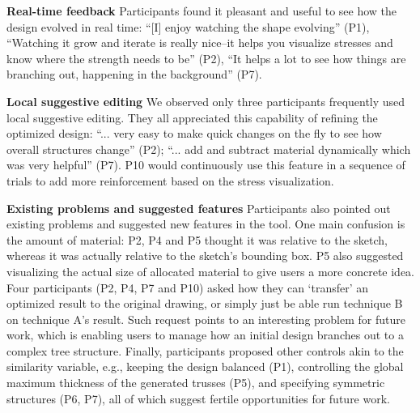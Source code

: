 \textbf{Real-time feedback} \hspace{0.1cm} Participants found it pleasant and useful to see how the design evolved in real time: ``[I] enjoy watching the shape evolving'' (P1), ``Watching it grow and iterate is really nice--it helps you visualize stresses and know where the strength needs to be'' (P2), ``It helps a lot to see how things are branching out, happening in the background'' (P7).

\textbf{Local suggestive editing} \hspace{0.1cm} We observed only three participants frequently used local suggestive editing. They all appreciated this capability of refining the optimized design: ``... very easy to make quick changes on the fly to see how overall structures change'' (P2); ``... add and subtract material dynamically which was very helpful'' (P7). P10 would continuously use this feature in a sequence of trials to add more reinforcement based on the stress visualization.

\textbf{Existing problems and suggested features} Participants also pointed out existing problems and suggested new features in the tool. One main confusion is the amount of material: P2, P4 and P5 thought it was relative to the sketch, whereas it was actually relative to the sketch's bounding box. P5 also suggested visualizing the actual size of allocated material to give users a more concrete idea. Four participants (P2, P4, P7 and P10) asked how they can `transfer' an optimized result to the original drawing, or simply just be able run technique B on technique A's result. Such request points to an interesting problem for future work, which is enabling users to manage how an initial design branches out to a complex tree structure. Finally, participants proposed other controls akin to the similarity variable, e.g., keeping the design balanced (P1), controlling the global maximum thickness of the generated trusses (P5), and specifying symmetric structures (P6, P7), all of which suggest fertile opportunities for future work.


